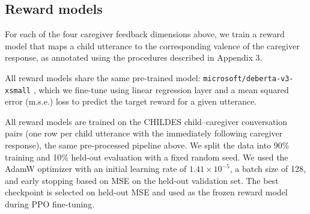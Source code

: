 \subsection*{Reward models}

For each of the four caregiver feedback dimensions above, we train a reward model that maps a child utterance to the corresponding valence of the caregiver response, as annotated using the procedures described in Appendix 3.



All reward models share the same pre-trained model:
\texttt{microsoft/deberta-v3-xsmall} \citep{he_debertav3_2022}, which we fine-tune using linear regression layer and a mean squared error (m.s.e.) loss to predict the target reward for a given utterance.

All reward models are trained on the CHILDES child--caregiver conversation pairs (one row per child utterance with the immediately following caregiver response), the same pre-processed  pipeline above. 
We split the data into 90\% training and 10\% held-out evaluation with a fixed random seed.  
We used the AdamW optimizer with an initial learning rate of $1.41 \times 10^{-5}$, a batch size of 128, and early stopping based on MSE on the held-out validation set.
The best checkpoint is selected on held-out MSE and used as the frozen reward model during PPO fine-tuning.


